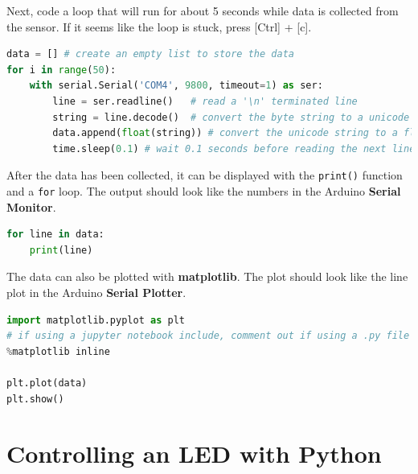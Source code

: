 \documentclass{book}
\begin{document}
    
        Next, code a loop that will run for about 5 seconds while data is
collected from the sensor. If it seems like the loop is stuck, press
{[}Ctrl{]} + {[}c{]}.
    




    
        \begin{lstlisting}[language=Python]
data = [] # create an empty list to store the data
for i in range(50):
    with serial.Serial('COM4', 9800, timeout=1) as ser:
        line = ser.readline()   # read a '\n' terminated line
        string = line.decode()  # convert the byte string to a unicode string
        data.append(float(string)) # convert the unicode string to a float and add to the data list
        time.sleep(0.1) # wait 0.1 seconds before reading the next line
\end{lstlisting}
    




    
        After the data has been collected, it can be displayed with the
\lstinline!print()! function and a \lstinline!for! loop. The output
should look like the numbers in the Arduino \textbf{Serial Monitor}.
    




    
        \begin{lstlisting}[language=Python]
for line in data:
    print(line)
\end{lstlisting}
    




    
        The data can also be plotted with \textbf{matplotlib}. The plot should
look like the line plot in the Arduino \textbf{Serial Plotter}.
    




    
        \begin{lstlisting}[language=Python]
import matplotlib.pyplot as plt
# if using a jupyter notebook include, comment out if using a .py file
%matplotlib inline

plt.plot(data)
plt.show()
\end{lstlisting}
    




    
        \section{Controlling an LED with
Python}\label{controlling-an-led-with-python}
    
\end{document}
